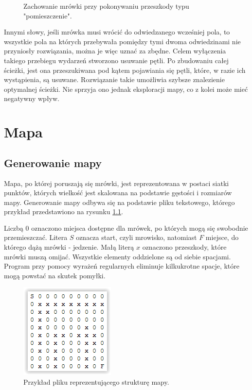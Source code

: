 \documentclass[printmode, openany, oneside, eng]{mgr}
\begin{document}
\begin{itemize}
\begin{figure}[H]
\caption{Zachowanie mrówki przy pokonywaniu przeszkody typu "pomieszczenie".}
\label{fig:eksperyment}
\end{figure}
 Innymi słowy, jeśli mrówka musi wrócić do odwiedzanego wcześniej pola, to wszystkie pola na których przebywała pomiędzy tymi dwoma odwiedzinami nie przyniosły rozwiązania, można je więc uznać za zbędne. Celem wyłączenia takiego przebiegu wydarzeń stworzono usuwanie pętli. Po zbudowaniu całej ścieżki, jest ona przeszukiwana pod kątem pojawiania się pętli, które, w razie ich wystąpienia, są usuwane. 
\newline Rozwiązanie takie umożliwia szybsze znalezienie optymalnej ścieżki. Nie sprzyja ono jednak eksploracji mapy, co z kolei może mieć negatywny wpływ.
\end{itemize}

\chapter{Mapa} \label{chap:mapa}

\section{Generowanie mapy}\label{sec:mapaGenerowanie}
Mapa, po której poruszają się mrówki, jest reprezentowana w postaci siatki punktów, których wielkość jest skalowana na podstawie gęstości i rozmiarów mapy. Generowanie mapy odbywa się na podstawie pliku tekstowego, którego przykład przedstawiono na rysunku \ref{fig:map1}.\newline

Liczbą $0$ oznaczono miejsca dostępne dla mrówek, po których mogą się swobodnie przemieszczać. Litera $S$ oznacza start, czyli mrowisko, natomiast $F$ miejsce, do którego dążą mrówki - jedzenie. Małą literą $x$ oznaczono przeszkody, które mrówki muszą omijać. Wszystkie elementy oddzielone są od siebie spacjami. Program przy pomocy wyrażeń regularnych eliminuje kilkukrotne spacje, które mogą powstać na skutek pomyłki.\newline

\begin{figure}[h]
\centering
\includegraphics[scale=1]{img/map1.png}
\caption{Przykład pliku reprezentującego strukturę mapy.}
\label{fig:map1}
\end{figure}
\end{document}
